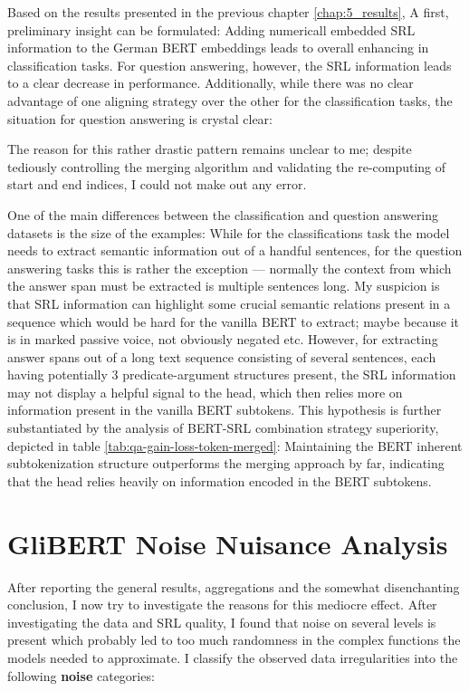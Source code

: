 \label{chap:5_discussion}


Based on the results presented in the previous chapter \ref{chap:5_results}, A first, preliminary
insight can be formulated: Adding numericall embedded SRL information to the German  BERT embeddings
leads to overall enhancing in classification tasks. For question answering, however, the SRL information
leads to a clear decrease in performance. Additionally, while there was no clear advantage of one aligning strategy
over the other for the classification tasks, the situation for question answering is crystal clear:

The reason for this rather {\color{red} drastic pattern
remains unclear to me}; despite tediously controlling the merging algorithm and validating the
re-computing of start and end indices, I could not make out any error.

One of the main differences between the classification and question answering datasets is the size of
the examples: While for the classifications task the model needs to extract semantic
information out of a handful sentences, for the question answering tasks this is rather the exception ---
normally the context from which the answer span must be extracted is multiple sentences long. My suspicion
is that SRL information can highlight some crucial semantic relations present in a sequence which would be
hard for the vanilla BERT to extract; maybe because it is in marked passive voice, not obviously negated etc.
However, for extracting answer spans out of a long text sequence consisting of several sentences, each having
potentially 3 predicate-argument structures present, the SRL information may not display a helpful signal to the
head, which then relies more on information present in the vanilla BERT subtokens. This hypothesis is further
substantiated by the analysis of BERT-SRL combination strategy superiority, depicted in table \ref{tab:qa-gain-loss-token-merged}:
Maintaining the BERT inherent subtokenization structure outperforms the merging approach by far, indicating that
the head relies heavily on information encoded in the BERT subtokens.


\section{GliBERT Noise Nuisance Analysis}
\label{sec:glinoise}


After reporting the general results, aggregations and the somewhat disenchanting conclusion, I
now try to investigate the reasons for this mediocre effect. After investigating the data and
SRL quality, I found that noise on several levels is present which probably led to too much
randomness in the complex functions the models needed to approximate. I classify the observed
data irregularities into the following \textbf{noise} categories:


